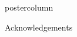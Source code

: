 \documentclass{beamer}
\begin{document}
\begin{frame}
\begin{columns}
\begin{column}{.618\textwidth}
\begin{beamercolorbox}[center]{postercolumn}
\begin{minipage}{.98\textwidth}
{\begin{myblock}{Acknowledgements}



\end{myblock}\vfill		

		}\end{minipage}\end{beamercolorbox}
	\end{column}
\end{columns}
\end{frame}
\end{document}
